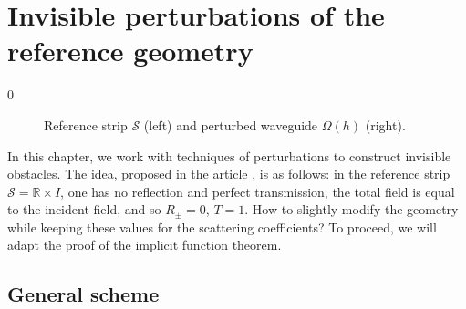 \documentclass[11pt,a4paper]{report}
\newcommand{\Om}{\Omega}
\newcommand{\R}{\mathbb{R}}
\begin{document}
 

\chapter{Invisible perturbations of the reference geometry}\label{chapterContinuation}
\setcounter {section} {0}

\begin{figure}[!ht]
\centering
{}
\caption{Reference strip $\mathcal{S}$ (left) and perturbed waveguide $\Om(h)$ (right). \label{PerturbedOm}}
\end{figure}

\noindent In this chapter, we work with techniques of perturbations to construct invisible obstacles. The idea, proposed in the article \cite{BoNa13}, is as follows: in the reference strip $\mathcal{S}=\R\times I$, one has no reflection and perfect transmission, the total field is equal to the incident field, and so $R_\pm=0$, $T=1$. How to slightly modify the geometry while keeping these values for the scattering coefficients? To proceed, we will adapt the proof of the implicit function theorem. 





\section{General scheme}\label{ParaGeneScheme}
\end{document}
